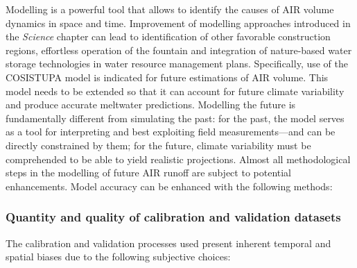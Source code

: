 Modelling is a powerful tool that allows to identify the causes of AIR volume dynamics in space and time.
Improvement of modelling approaches introduced in the \textit{Science} chapter can lead to identification of
other favorable construction regions, effortless operation of the fountain and integration of nature-based water
storage technologies in water resource management plans. Specifically, use of the COSISTUPA model is indicated
for future estimations of \ac{AIR} volume. This model needs to be extended so that it can account for future
climate variability and produce accurate meltwater predictions. Modelling the future is fundamentally different
from simulating the past: for the past, the model serves as a tool for interpreting and best exploiting field
measurements---and can be directly constrained by them; for the future, climate variability must be comprehended
to be able to yield realistic projections. Almost all methodological steps in the modelling of future \ac{AIR}
runoff are subject to potential enhancements. Model accuracy can be enhanced with the following methods:



\subsubsection{Quantity and quality of calibration and validation datasets}


The calibration and validation processes used present inherent temporal and spatial biases due to the following
subjective choices:


